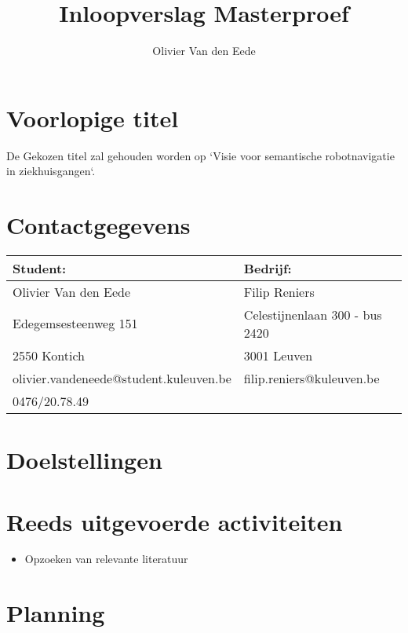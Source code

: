 \documentclass[11pt,a4paper]{article}
\title{Inloopverslag Masterproef}
\author{Olivier Van den Eede}
\date{}
\begin{document}
    \maketitle
    
    \section{Voorlopige titel}
        De Gekozen titel zal gehouden worden op `Visie voor semantische robotnavigatie in ziekhuisgangen`.

    \section{Contactgegevens}
        \begin{table}[h]
            \begin{tabular}{l | l}
                Student: & Bedrijf: \\ \hline
                Olivier Van den Eede & Filip Reniers \\
                Edegemsesteenweg 151 & Celestijnenlaan 300 - bus 2420 \\
                2550 Kontich & 3001 Leuven \\
                olivier.vandeneede@student.kuleuven.be & filip.reniers@kuleuven.be \\
                0476/20.78.49 & \\
            \end{tabular}
        \end{table}

    \section{Doelstellingen}

    \section{Reeds uitgevoerde activiteiten}

        \begin{itemize}
            \item Opzoeken van relevante literatuur
        \end{itemize}

    \section{Planning}
\end{document}
